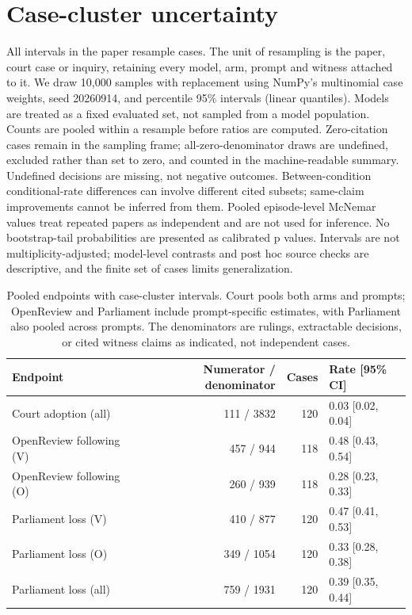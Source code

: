 \section{Case-cluster uncertainty}\label{app:statistics}
All intervals in the paper resample cases. The unit of resampling is the paper, court case or inquiry, retaining every model, arm, prompt and witness attached to it. We draw 10,000 samples with replacement using NumPy's multinomial case weights, seed 20260914, and percentile 95\% intervals (linear quantiles). Models are treated as a fixed evaluated set, not sampled from a model population. Counts are pooled within a resample before ratios are computed. Zero-citation cases remain in the sampling frame; all-zero-denominator draws are undefined, excluded rather than set to zero, and counted in the machine-readable summary. Undefined decisions are missing, not negative outcomes. Between-condition conditional-rate differences can involve different cited subsets; same-claim improvements cannot be inferred from them.
Pooled episode-level McNemar values treat repeated papers as independent and are not used for inference. No bootstrap-tail probabilities are presented as calibrated p values. Intervals are not multiplicity-adjusted; model-level contrasts and post hoc source checks are descriptive, and the finite set of cases limits generalization.
\begin{table}[htbp]\centering\small
\caption{Pooled endpoints with case-cluster intervals. Court pools both arms and prompts; OpenReview and Parliament include prompt-specific estimates, with Parliament also pooled across prompts. The denominators are rulings, extractable decisions, or cited witness claims as indicated, not independent cases.}
\begin{tabular}{lrrl}\toprule Endpoint & Numerator / denominator & Cases & Rate [95\% CI] \\\midrule
Court adoption (all) & 111 / 3832 & 120 & 0.03 [0.02, 0.04] \\
OpenReview following (V) & 457 / 944 & 118 & 0.48 [0.43, 0.54] \\
OpenReview following (O) & 260 / 939 & 118 & 0.28 [0.23, 0.33] \\
Parliament loss (V) & 410 / 877 & 120 & 0.47 [0.41, 0.53] \\
Parliament loss (O) & 349 / 1054 & 120 & 0.33 [0.28, 0.38] \\
Parliament loss (all) & 759 / 1931 & 120 & 0.39 [0.35, 0.44] \\
\bottomrule\end{tabular}\end{table}
